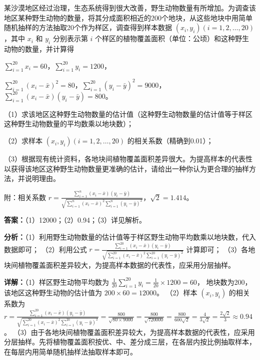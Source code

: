 \begin{question}[points=12]
某沙漠地区经过治理，生态系统得到很大改善，野生动物数量有所增加。为调查该地区某种野生动物的数量，将其分成面积相近的200个地块，从这些地块中用简单随机抽样的方法抽取20个作为样区，调查得到样本数据 $(x_i,y_i)(i=1,2,\ldots,20)$，其中 $x_i$ 和 $y_i$ 分别表示第 $i$ 个样区的植物覆盖面积（单位：公顷）和这种野生动物的数量，并计算得

$\sum_{i=1}^{20}x_i=60$，$\sum_{i=1}^{20}y_i=1200$，

$\sum_{i=1}^{20}(x_i-\bar{x})^2=80$，$\sum_{i=1}^{20}(y_i-\bar{y})^2=9000$，$\sum_{i=1}^{20}(x_i-\bar{x})(y_i-\bar{y})=800$。

（1）求该地区这种野生动物数量的估计值（这种野生动物数量的估计值等于样区这种野生动物数量的平均数乘以地块数）；

（2）求样本 $(x_i,y_i)(i=1,2,\ldots,20)$ 的相关系数（精确到0.01）；

（3）根据现有统计资料，各地块间植物覆盖面积差异很大。为提高样本的代表性以获得该地区这种野生动物数量更准确的估计，请给出一种你认为更合理的抽样方法，并说明理由。

附：相关系数 $r=\frac{\sum_{i=1}^{n}(x_i-\bar{x})(y_i-\bar{y})}{\sqrt{\sum_{i=1}^{n}(x_i-\bar{x})^2\sum_{i=1}^{n}(y_i-\bar{y})^2}}$，$\sqrt{2}=1.414$。
\begin{solution}
\textbf{答案：}（1）12000；（2）0.94；（3）详见解析。

\textbf{分析：}（1）利用野生动物数量的估计值等于样区野生动物平均数乘以地块数，代入数据即可；
（2）利用公式 $r=\frac{\sum_{i=1}^{20}(x_i-\bar{x})(y_i-\bar{y})}{\sqrt{\sum_{i=1}^{20}(x_i-\bar{x})^2\sum_{i=1}^{20}(y_i-\bar{y})^2}}$ 计算即可；
（3）各地块间植物覆盖面积差异较大，为提高样本数据的代表性，应采用分层抽样。

\textbf{详解：}（1）样区野生动物平均数为 $\frac{1}{20}\sum_{i=1}^{20}y_i = \frac{1}{20}\times1200=60$，
地块数为200，该地区这种野生动物的估计值为 $200\times60=12000$。
（2）样本 $(x_i,y_i)$ 的相关系数为
$r = \frac{\sum_{i=1}^{20}(x_i-\bar{x})(y_i-\bar{y})}{\sqrt{\sum_{i=1}^{20}(x_i-\bar{x})^2\sum_{i=1}^{20}(y_i-\bar{y})^2}} = \frac{800}{\sqrt{80\times9000}} = \frac{800}{\sqrt{720000}} = \frac{800}{600\sqrt{2}} = \frac{4}{3\sqrt{2}} = \frac{2\sqrt{2}}{3} \approx 0.94$。
（3）由于各地块间植物覆盖面积差异较大，为提高样本数据的代表性，应采用分层抽样。先将植物覆盖面积按优、中、差分成三层，在各层内按比例抽取样本，在每层内用简单随机抽样法抽取样本即可。
\end{solution}
\end{question}

